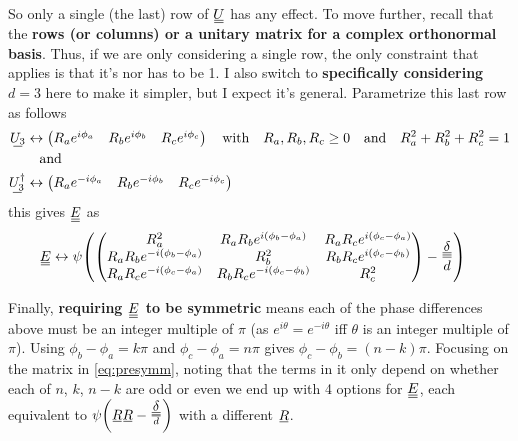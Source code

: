 \documentclass[11pt]{article}
\newcommand\textbff[1]{\textbf{\boldmath #1}}
\newcommand\barbelow[1]{\stackunder[1.2pt]{$#1$}{\rule{1.5ex}{.1ex}}}
\newcommand{\su}[1]{\barbelow{#1}}
\newcommand{\du}[1]{\barbelow{\barbelow{#1}}}
\begin{document}
So only a single (the last) row of $\du{U}$ has any effect.
To move further, recall that the \textbff{rows (or columns) or a unitary matrix for a complex orthonormal basis}.
Thus, if we are only considering a single row, the only constraint that applies is that it's nor has to be 1.
I also switch to \textbff{specifically considering $d=3$} here to make it simpler, but I expect it's general.
Parametrize this last row as follows
\begin{align}
    \su{U_3} &\leftrightarrow \begin{pmatrix} R_ae^{i\phi_a} & R_be^{i\phi_b} & R_ce^{i\phi_c} \end{pmatrix} \qq{with} R_a, R_b, R_c \geq 0 \qq{and} R_a^2 + R_b^2 + R_c^2 = 1 \\
    &\qq{and} \nonumber \\
    \su{U^\dagger_3} &\leftrightarrow \begin{pmatrix} R_ae^{-i\phi_a} & R_be^{-i\phi_b} & R_ce^{-i\phi_c} \end{pmatrix}
\end{align}
this gives $\du{E}$ as
\begin{align}
    \du{E} &\leftrightarrow \psi \qty(\begin{pmatrix}
        R_a^2 & R_a R_b e^{i(\phi_b-\phi_a)} & R_a R_c e^{i(\phi_c-\phi_a)} \\
        R_a R_b e^{-i(\phi_b-\phi_a)} & R_b^2 & R_b R_c e^{i(\phi_c-\phi_b)} \\
        R_a R_c e^{-i(\phi_c-\phi_a)} & R_b R_c e^{-i(\phi_c-\phi_b)} & R_c^2
    \end{pmatrix} - \frac{\du{\delta}}{d}) \label{eq:presymm}
\end{align}

\pagebreak
Finally, \textbff{requiring $\du{E}$ to be symmetric} means each of the phase differences above must be an integer multiple of $\pi$ (as $e^{i\theta}=e^{-i\theta}$ iff $\theta$ is an integer multiple of $\pi$).
Using $\phi_b-\phi_a = k\pi$ and $\phi_c-\phi_a=n\pi$ gives $\phi_c-\phi_b=(n-k)\pi$.
Focusing on the matrix in \cref{eq:presymm}, noting that the terms in it only depend on whether each of $n$, $k$, $n-k$ are odd or even we end up with 4 options for $\du{E}$, each equivalent to $\psi\qty(\su{R}\su{R}-\frac{\du{\delta}}{d})$ with a different $\su{R}$.
\end{document}
